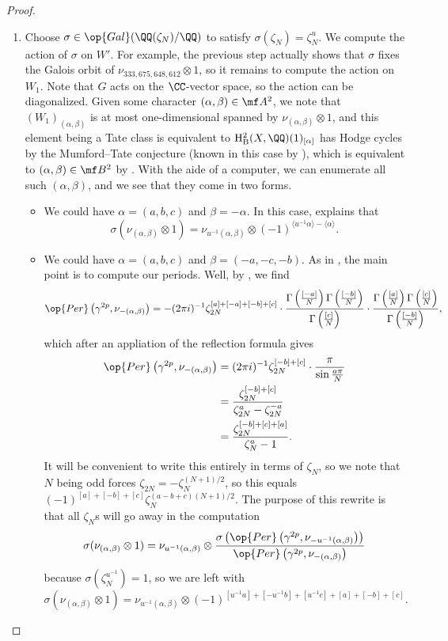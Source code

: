 \documentclass[../thesis.tex]{subfiles}
\begin{document}
\begin{proof}
\begin{enumerate}
		\item Choose $\sigma\in\op{Gal}(\QQ(\zeta_N)/\QQ)$ to satisfy $\sigma(\zeta_N)=\zeta_N^u$. We compute the action of $\sigma$ on $W'$. For example, the previous step actually shows that $\sigma$ fixes the Galois orbit of $\nu_{333,675,648,612}\otimes1$, so it remains to compute the action on $W_1$. Note that $G$ acts on the $\CC$-vector space, so the action can be diagonalized. Given some character $(\alpha,\beta)\in\mf A^2$, we note that $(W_1)_{(\alpha,\beta)}$ is at most one-dimensional spanned by $\nu_{(\alpha,\beta)}\otimes1$, and this element being a Tate class is equivalent to $\mathrm H^{2}_{\mathrm B}(X,\QQ)(1)_{[\alpha]}$ has Hodge cycles by the Mumford--Tate conjecture (known in this case by ), which is equivalent to $(\alpha,\beta)\in\mf B^2$ by . With the aide of a computer, we can enumerate all such $(\alpha,\beta)$, and we see that they come in two forms.
		\begin{itemize}
			\item We could have $\alpha=(a,b,c)$ and $\beta=-\alpha$. In this case,  explains that
			\[\sigma(\nu_{(\alpha,\beta)}\otimes1)=\nu_{u^{-1}(\alpha,\beta)}\otimes(-1)^{\langle u^{-1}\alpha\rangle-\langle\alpha\rangle}.\]
			\item We could have $\alpha=(a,b,c)$ and $\beta=(-a,-c,-b)$. As in , the main point is to compute our periods. Well, by , we find
			\[\op{Per}\left(\gamma^{2p},\nu_{-(\alpha,\beta)}\right)=-(2\pi i)^{-1}\zeta^{[a]+[-a]+[-b]+[c]}_{2N}\cdot\frac{\Gamma\left(\frac{[-a]}N\right)\Gamma\left(\frac{[-b]}N\right)}{\Gamma\left(\frac{[c]}N\right)}\cdot\frac{\Gamma\left(\frac{[a]}N\right)\Gamma\left(\frac{[c]}N\right)}{\Gamma\left(\frac{[-b]}N\right)},\]
			which after an appliation of the reflection formula gives
			\begin{align*}
				\op{Per}\left(\gamma^{2p},\nu_{-(\alpha,\beta)}\right) &= (2\pi i)^{-1}\zeta_{2N}^{[-b]+[c]}\cdot\frac\pi{\sin\frac{a\pi}N} \\
				&= \frac{\zeta_{2N}^{[-b]+[c]}}{\zeta_{2N}^a-\zeta_{2N}^{-a}} \\
				&= \frac{\zeta_{2N}^{[-b]+[c]+[a]}}{\zeta_{N}^a-1}.
			\end{align*}
			It will be convenient to write this entirely in terms of $\zeta_N$, so we note that $N$ being odd forces $\zeta_{2N}=-\zeta_N^{(N+1)/2}$, so this equals $(-1)^{[a]+[-b]+[c]}\zeta_N^{(a-b+c)(N+1)/2}$. The purpose of this rewrite is that all $\zeta_N$s will go away in the computation
			\[\sigma(\nu_{(\alpha,\beta)}\otimes1)=\nu_{u^{-1}(\alpha,\beta)}\otimes\frac{\sigma\left(\op{Per}\left(\gamma^{2p},\nu_{-u^{-1}(\alpha,\beta)}\right)\right)}{\op{Per}\left(\gamma^{2p},\nu_{-(\alpha,\beta)}\right)}\]
			because $\sigma\left(\zeta_N^{u^{-1}}\right)=1$, so we are left with
			\[\sigma(\nu_{(\alpha,\beta)}\otimes1)=\nu_{u^{-1}(\alpha,\beta)}\otimes(-1)^{[u^{-1}a]+[-u^{-1}b]+[u^{-1}c]+[a]+[-b]+[c]}.\]
		\end{itemize}


\end{enumerate}
\end{proof}
\end{document}
